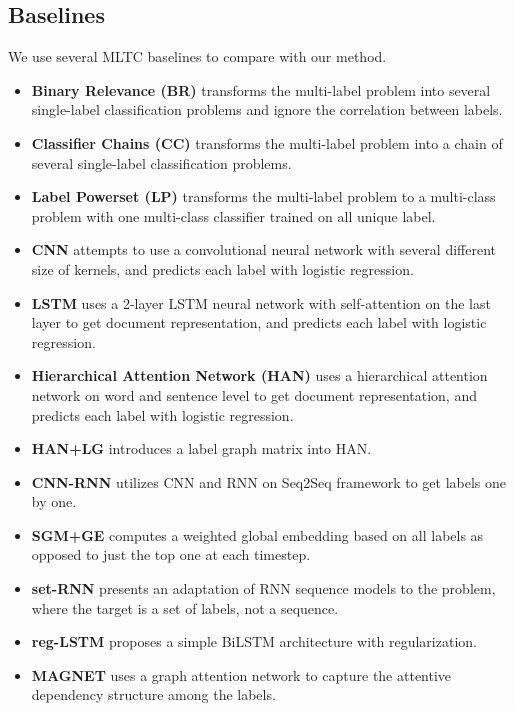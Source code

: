 \documentclass[runningheads]{llncs}
\begin{document}
\subsection{Baselines}
We use several MLTC baselines to compare with our method.
\begin{itemize}
    \item \textbf{Binary Relevance (BR)}\cite{boutell2004learning} transforms the multi-label problem into several single-label classification problems and ignore the correlation between labels.
    \item \textbf{Classifier Chains (CC)}\cite{read2011classifier} transforms the multi-label problem into a chain of several single-label classification problems.
    \item \textbf{Label Powerset (LP)}\cite{tsoumakas2007multi} transforms the multi-label problem to a multi-class problem with one multi-class classifier trained on all unique label.
    \item \textbf{CNN}\cite{kim2014convolutional} attempts to use a convolutional neural network with several different size of kernels, and predicts each label with logistic regression.
    \item \textbf{LSTM}\cite{hochreiter1997long} uses a 2-layer LSTM neural network with self-attention on the last layer to get document representation, and predicts each label with logistic regression.
    \item \textbf{Hierarchical Attention Network (HAN)}\cite{yang2016hierarchical} uses a hierarchical attention network on word and sentence level to get document representation, and predicts each label with logistic regression.
    \item \textbf{HAN+LG}\cite{zhao2018review} introduces a label graph matrix into HAN.
    \item \textbf{CNN-RNN}\cite{chen2017ensemble} utilizes CNN and RNN on Seq2Seq framework to get labels one by one.
    \item \textbf{SGM+GE}\cite{yang2018sgm} computes a weighted global embedding based on all labels as opposed to just the top one at each timestep.
    \item \textbf{set-RNN}\cite{qin2019adapting} presents an adaptation of RNN sequence models to the problem, where the target is a set of labels, not a sequence.
    \item \textbf{reg-LSTM}\cite{adhikari2019rethinking} proposes a simple BiLSTM architecture with regularization.
    \item \textbf{MAGNET}\cite{pal2020multi} uses a graph attention network to capture the attentive dependency structure among the labels.
\end{itemize}
\end{document}
